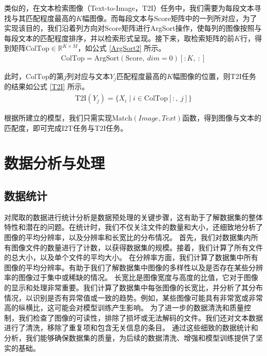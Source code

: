 \documentclass[a4paper]{zreport}
\begin{document}
类似的，在文本检索图像（Text-to-Image，T2I）任务中，我们需要为每段文本寻找与其匹配程度最高的$K$幅图像。而每段文本与$\mathrm{Score}$矩阵中的一列所对应，为了实现该目的，我们沿着列方向对$\mathrm{Score}$矩阵进行ArgSort操作，使每列的图像按照与每段文本的匹配程度排序，并以检索形式呈现。接下来，取检索矩阵的前$K$行，得到矩阵$\mathrm{ColTop} \in \mathbb{R}^{K \times M}$，如公式 \eqref{ArgSort2} 所示。
\begin{gather}
\mathrm{ColTop} = \mathrm{ArgSort}\left(\mathrm{Score},~dim=0\right)\left[:K,~:\right]
\label{ArgSort2}
\end{gather}

此时，$\mathrm{ColTop}$的第$j$列对应与文本$Y_j$匹配程度最高的$K$幅图像的位置，则T2I任务的结果如公式 \eqref{T2I} 所示。
\begin{gather}
\mathrm{T2I}\left(Y_j\right) = \{X_i\mid i \in \mathrm{ColTop}\left[:,~j\right]\}\label{T2I}
\end{gather}

根据所建立的模型，我们只需实现$\mathrm{Match}\left(Image, Text\right)$函数，得到图像与文本的匹配度，即可完成I2T任务与T2I任务。


\section{数据分析与处理}

\subsection{数据统计}

对爬取的数据进行统计分析是数据预处理的关键步骤，这有助于了解数据集的整体特性和潜在的问题。在统计时，我们不仅关注文件的数量和大小，还细致地分析了图像的平均分辨率，以及分辨率和长宽比的分布情况。
首先，我们对数据集内所有图像文件的数量进行了计数，以获得数据集的规模。接着，我们计算了所有文件的总大小，以及单个文件的平均大小。
在分辨率方面，我们计算了数据集中所有图像的平均分辨率。有助于我们了解数据集中图像的多样性以及是否存在某些分辨率的图像过于集中或稀缺的情况。
长宽比是图像宽度与高度的比值，它对于图像的显示和处理非常重要。我们计算了数据集中每张图像的长宽比，并分析了其分布情况，以识别是否有异常值或一致的趋势。例如，某些图像可能具有非常宽或非常高的纵横比，这可能会对模型训练产生影响。
为了进一步的数据清洗和质量控制，我们检查了图像的可读性，排除了损坏或无法解码的文件。我们还对文本数据进行了清洗，移除了重复项和包含无关信息的条目。
通过这些细致的数据统计和分析，我们能够确保数据集的质量，为后续的数据清洗、增强和模型训练提供了坚实的基础。
\end{document}
